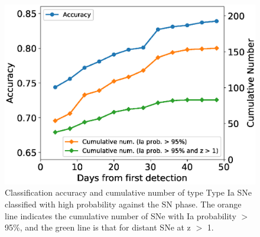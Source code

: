 \documentclass[proof]{pasj01}
\providecommand{\DIFadd}[1]{{\protect\color{blue} \sf #1}} %
\providecommand{\DIFdel}[1]{{\protect\color{red} \scriptsize #1}} %
\providecommand{\DIFaddFL}[1]{\DIFadd{#1}} %
\providecommand{\DIFdelFL}[1]{\DIFdel{#1}} %
\providecommand{\DIFaddbeginFL}{} %
\providecommand{\DIFaddendFL}{} %
\providecommand{\DIFdelbeginFL}{} %
\providecommand{\DIFdelendFL}{} %
\newcommand{\DIFscaledelfig}{0.5}
\newlength{\DIFdelgraphicswidth} %
\newlength{\DIFdelgraphicsheight} %
\newcommand{\DIFaddincludegraphics}[2][]{{\color{blue}\fbox{\DIFOincludegraphics[#1]{#2}}}} %
\newcommand{\DIFdelincludegraphics}[2][]{%
\sbox{\DIFdelgraphicsbox}{\DIFOincludegraphics[#1]{#2}}%
\settoboxwidth{\DIFdelgraphicswidth}{\DIFdelgraphicsbox} %
\settoboxtotalheight{\DIFdelgraphicsheight}{\DIFdelgraphicsbox} %
\scalebox{\DIFscaledelfig}{%
\parbox[b]{\DIFdelgraphicswidth}{\usebox{\DIFdelgraphicsbox}\\[-\baselineskip] \rule{\DIFdelgraphicswidth}{0em}}\llap{\resizebox{\DIFdelgraphicswidth}{\DIFdelgraphicsheight}{%
\setlength{\unitlength}{\DIFdelgraphicswidth}%
\begin{picture}(1,1)%
\thicklines\linethickness{2pt} %
{\color[rgb]{1,0,0}\put(0,0){\framebox(1,1){}}}%
{\color[rgb]{1,0,0}\put(0,0){\line( 1,1){1}}}%
{\color[rgb]{1,0,0}\put(0,1){\line(1,-1){1}}}%
\end{picture}%
}\hspace*{3pt}}} %
} %
\DeclareRobustCommand{\DIFaddbeginFL}{\DIFOaddbeginFL \let\includegraphics\DIFaddincludegraphics} %
\DeclareRobustCommand{\DIFaddendFL}{\DIFOaddendFL \let\includegraphics\DIFOincludegraphics} %
\DeclareRobustCommand{\DIFdelbeginFL}{\DIFOdelbeginFL \let\includegraphics\DIFdelincludegraphics} %
\DeclareRobustCommand{\DIFdelendFL}{\DIFOaddendFL \let\includegraphics\DIFOincludegraphics} %
\begin{document}
\begin{figure}[htbp]
  \begin{center}
     \includegraphics[width=\columnwidth]{figures/n_observations_SNphase_v200318.eps}
  \end{center}
  \caption{%
  Classification accuracy and cumulative number of \DIFdelbeginFL \DIFdelFL{type }\DIFdelendFL \DIFaddbeginFL \DIFaddFL{Type }\DIFaddendFL Ia SNe classified with high probability against \DIFaddbeginFL \DIFaddFL{the }\DIFaddendFL SN phase.
  The orange line indicates the cumulative number of SNe with Ia probability $>$ 95\%, and \DIFaddbeginFL \DIFaddFL{the }\DIFaddendFL green line is that for distant SNe at z $>$ 1.
  }%
  \label{fig:n_observations_SNphase}
\end{figure}
%
\end{document}
